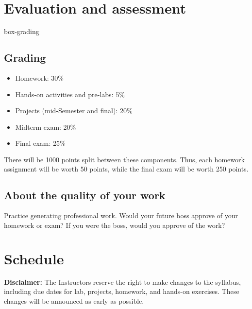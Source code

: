 \documentclass[11pt, a4paper]{article}
\def\hsm#1{{\color{blue}{#1}}}
\begin{document}
\hypertarget{evaluation}{}
\section*{Evaluation and assessment}

\begin{BlockClass}{box-grading}
\subsection*{Grading}
\begin{itemize}
\item Homework: 30\%
\item Hands-on activities and pre-labs: 5\%
\item Projects (mid-Semester and final): 20\%
\item Midterm exam: 20\%
\item Final exam: 25\%
\end{itemize}
There will be 1000 points split between these components. Thus, each homework assignment will be worth 50 points, while the final exam will be worth 250 points. 

\subsection*{About the quality of your work} Practice generating professional work. Would your future boss approve of your homework or exam? If you were the boss, would you approve of the work? \hsm{We reserve the right to deduct points for sloppy execution of all graded work.}
\end{BlockClass}




\hypertarget{schedule}{}
\section*{Schedule}

\textbf{Disclaimer:} The Instructors reserve the right to make changes to the syllabus, including due dates for lab, projects, homework, and hands-on exercises. These changes will be announced as early as possible.

\def\maybeTopic{${}^*$}
\end{document}
